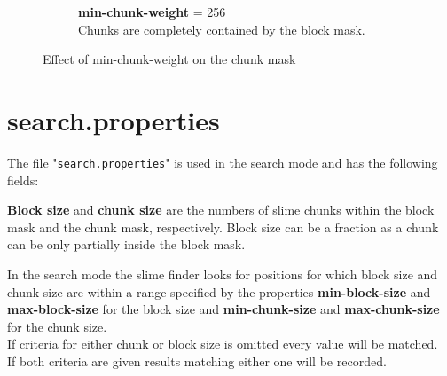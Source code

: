 \documentclass[12pt]{article}
\begin{document}
\begin{figure}[H]
\begin{subfigure}{0.5\textwidth}
\captionsetup{width=.8\linewidth}
\caption*{\textbf{min-chunk-weight} = 256\\
Chunks are completely contained by the block mask.}
\end{subfigure}
\caption{Effect of min-chunk-weight on the chunk mask}
\label{fig:chunk-mask}
\end{figure}

\pagebreak
\section{\textbf{search.properties}}
\label{search.properties}
The file "\texttt{search.properties}" is used in the search mode and has the following fields:

\hspace{1.0cm}

\textbf{Block size} and \textbf{chunk size} are the numbers of slime chunks within the block mask and the chunk mask, respectively. Block size can be a fraction as a chunk can be only partially inside the block mask.

In the search mode the slime finder looks for positions for which block size and chunk size are within a range specified by the properties \textbf{min-block-size} and \textbf{max-block-size} for the block size and \textbf{min-chunk-size} and \textbf{max-chunk-size} for the chunk size.\\
If criteria for either chunk or block size is omitted every value will be matched.\\
If both criteria are given results matching either one will be recorded.
\end{document}
